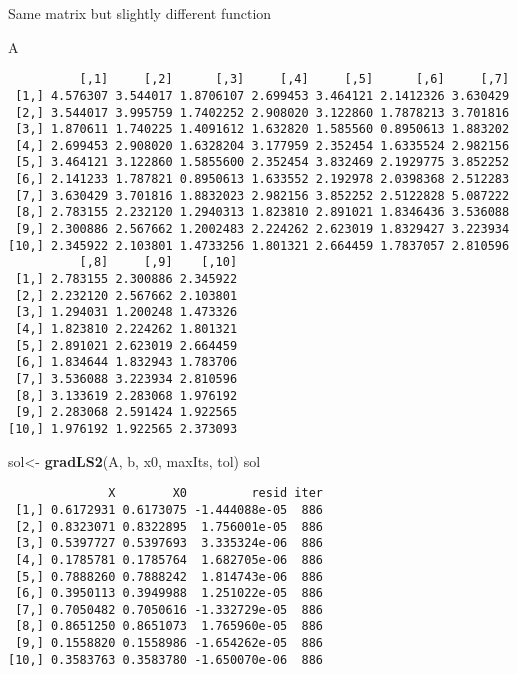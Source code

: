 \documentclass[]{article}
\newenvironment{Shaded}{\begin{snugshade}}{\end{snugshade}}
\newcommand{\KeywordTok}[1]{\textcolor[rgb]{0.13,0.29,0.53}{\textbf{#1}}}
\newcommand{\StringTok}[1]{\textcolor[rgb]{0.31,0.60,0.02}{#1}}
\newcommand{\NormalTok}[1]{#1}
\begin{document}
Same matrix but slightly different function

\begin{Shaded}
\begin{Highlighting}[]
\NormalTok{A}
\end{Highlighting}
\end{Shaded}

\begin{verbatim}
          [,1]     [,2]      [,3]     [,4]     [,5]      [,6]     [,7]
 [1,] 4.576307 3.544017 1.8706107 2.699453 3.464121 2.1412326 3.630429
 [2,] 3.544017 3.995759 1.7402252 2.908020 3.122860 1.7878213 3.701816
 [3,] 1.870611 1.740225 1.4091612 1.632820 1.585560 0.8950613 1.883202
 [4,] 2.699453 2.908020 1.6328204 3.177959 2.352454 1.6335524 2.982156
 [5,] 3.464121 3.122860 1.5855600 2.352454 3.832469 2.1929775 3.852252
 [6,] 2.141233 1.787821 0.8950613 1.633552 2.192978 2.0398368 2.512283
 [7,] 3.630429 3.701816 1.8832023 2.982156 3.852252 2.5122828 5.087222
 [8,] 2.783155 2.232120 1.2940313 1.823810 2.891021 1.8346436 3.536088
 [9,] 2.300886 2.567662 1.2002483 2.224262 2.623019 1.8329427 3.223934
[10,] 2.345922 2.103801 1.4733256 1.801321 2.664459 1.7837057 2.810596
          [,8]     [,9]    [,10]
 [1,] 2.783155 2.300886 2.345922
 [2,] 2.232120 2.567662 2.103801
 [3,] 1.294031 1.200248 1.473326
 [4,] 1.823810 2.224262 1.801321
 [5,] 2.891021 2.623019 2.664459
 [6,] 1.834644 1.832943 1.783706
 [7,] 3.536088 3.223934 2.810596
 [8,] 3.133619 2.283068 1.976192
 [9,] 2.283068 2.591424 1.922565
[10,] 1.976192 1.922565 2.373093
\end{verbatim}

\begin{Shaded}
\begin{Highlighting}[]
\NormalTok{sol<-}\StringTok{ }\KeywordTok{gradLS2}\NormalTok{(A, b, x0, maxIts, tol)}
\NormalTok{sol}
\end{Highlighting}
\end{Shaded}

\begin{verbatim}
              X        X0         resid iter
 [1,] 0.6172931 0.6173075 -1.444088e-05  886
 [2,] 0.8323071 0.8322895  1.756001e-05  886
 [3,] 0.5397727 0.5397693  3.335324e-06  886
 [4,] 0.1785781 0.1785764  1.682705e-06  886
 [5,] 0.7888260 0.7888242  1.814743e-06  886
 [6,] 0.3950113 0.3949988  1.251022e-05  886
 [7,] 0.7050482 0.7050616 -1.332729e-05  886
 [8,] 0.8651250 0.8651073  1.765960e-05  886
 [9,] 0.1558820 0.1558986 -1.654262e-05  886
[10,] 0.3583763 0.3583780 -1.650070e-06  886
\end{verbatim}
\end{document}

